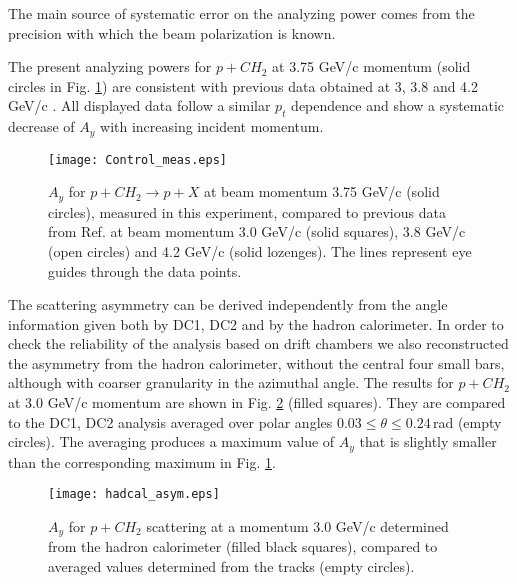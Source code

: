 \documentclass[epj]{svjour}
\begin{document}
The main source of systematic error on the analyzing power comes from the precision with
which the beam polarization is known.

The present analyzing powers for $p+CH_2$ at 3.75 GeV/c momentum (solid circles in Fig. \ref{Fig:p+CH2_3-42}) are consistent with previous data obtained at 3, 3.8 and 4.2 GeV/c  \cite{Azhgirey:2004yk}. All displayed data follow a similar $p_t$ dependence and show a systematic decrease of $A_y$ with increasing incident momentum.

\begin{figure}[htp!]
\texttt{[image: Control\_meas.eps]}
\caption{$A_y$ for $p+CH_2\to p+X$ at beam momentum 3.75 GeV/c (solid circles), measured in this experiment, compared to  previous data from Ref. \cite{Azhgirey:2004yk} at beam momentum 3.0 GeV/c (solid squares), 3.8 GeV/c (open circles)  and 4.2 GeV/c (solid  lozenges). The lines represent eye guides through the data points.}
\label{Fig:p+CH2_3-42}
\end{figure}

The scattering asymmetry can be derived independently from the angle information given both by DC1, DC2 and by the hadron calorimeter.  In order to check the reliability of the analysis based on drift chambers we also reconstructed the asymmetry from the hadron calorimeter, without the central four small bars,  although with coarser granularity in the azimuthal angle. The results for $p+CH_2$ at 3.0 GeV/c momentum are shown in  Fig. \ref{Fig:tracks-hadcal} (filled squares). They are compared to the DC1, DC2 analysis averaged over polar angles $0.03\le \theta\le0.24$\,rad (empty circles). The averaging produces a maximum value of $A_y$ that is slightly smaller than the corresponding maximum in Fig. \ref{Fig:p+CH2_3-42}.  

\begin{figure}[htp!]
\texttt{[image: hadcal\_asym.eps]}
\caption{$A_y$ for $p+CH_2$ scattering at a momentum 3.0 GeV/c determined from the hadron calorimeter (filled black squares), compared to averaged values determined from the tracks (empty circles). }
\label{Fig:tracks-hadcal}
\end{figure}
\end{document}
